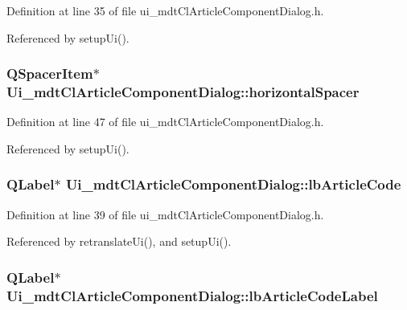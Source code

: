 Definition at line 35 of file ui\-\_\-mdt\-Cl\-Article\-Component\-Dialog.\-h.



Referenced by setup\-Ui().

\hypertarget{class_ui__mdt_cl_article_component_dialog_ad73c7271cf228bae1dc3130b08591ecf}{
\subsubsection[{horizontal\-Spacer}]{\setlength{\rightskip}{0pt plus 5cm}Q\-Spacer\-Item$\ast$ Ui\-\_\-mdt\-Cl\-Article\-Component\-Dialog\-::horizontal\-Spacer}}\label{class_ui__mdt_cl_article_component_dialog_ad73c7271cf228bae1dc3130b08591ecf}


Definition at line 47 of file ui\-\_\-mdt\-Cl\-Article\-Component\-Dialog.\-h.



Referenced by setup\-Ui().

\hypertarget{class_ui__mdt_cl_article_component_dialog_aed003c393f0f7343d5510d6120847f79}{
\subsubsection[{lb\-Article\-Code}]{\setlength{\rightskip}{0pt plus 5cm}Q\-Label$\ast$ Ui\-\_\-mdt\-Cl\-Article\-Component\-Dialog\-::lb\-Article\-Code}}\label{class_ui__mdt_cl_article_component_dialog_aed003c393f0f7343d5510d6120847f79}


Definition at line 39 of file ui\-\_\-mdt\-Cl\-Article\-Component\-Dialog.\-h.



Referenced by retranslate\-Ui(), and setup\-Ui().

\hypertarget{class_ui__mdt_cl_article_component_dialog_af636935739685768b44097d1c391bd21}{
\subsubsection[{lb\-Article\-Code\-Label}]{\setlength{\rightskip}{0pt plus 5cm}Q\-Label$\ast$ Ui\-\_\-mdt\-Cl\-Article\-Component\-Dialog\-::lb\-Article\-Code\-Label}}\label{class_ui__mdt_cl_article_component_dialog_af636935739685768b44097d1c391bd21}


